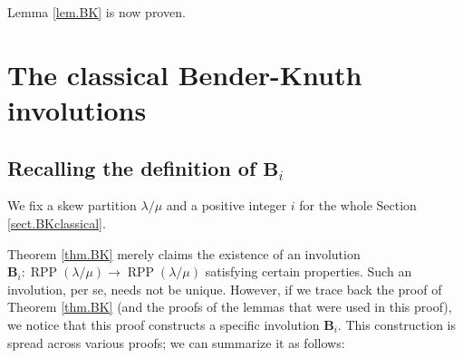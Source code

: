\documentclass[numbers=enddot,12pt,final,onecolumn,notitlepage]{scrartcl}%
\theoremstyle{definition}
\begin{document}
Lemma \ref{lem.BK} is now proven.

\section{\label{sect.BKclassical}The classical Bender-Knuth involutions}

\subsection{Recalling the definition of $\mathbf{B}_{i}$}

We fix a skew partition $\lambda/\mu$ and a positive integer $i$ for the whole
Section \ref{sect.BKclassical}.

Theorem \ref{thm.BK} merely claims the existence of an involution
$\mathbf{B}_{i}:\operatorname*{RPP}\left(  \lambda/\mu\right)  \rightarrow
\operatorname*{RPP}\left(  \lambda/\mu\right)  $ satisfying certain
properties. Such an involution, per se, needs not be unique. However, if we
trace back the proof of Theorem \ref{thm.BK} (and the proofs of the lemmas
that were used in this proof), we notice that this proof constructs a specific
involution $\mathbf{B}_{i}$. This construction is spread across various
proofs; we can summarize it as follows:
\end{document}
